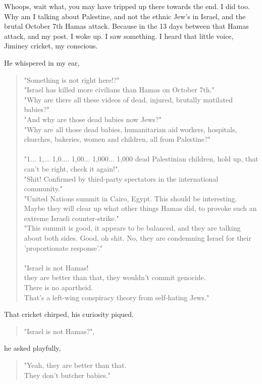 \documentclass[16pt,openany,oneside]{book}
\begin{document}
Whoops, wait what, you may have tripped up there towards the end. I did too. Why am I talking about Palestine, and not the ethnic Jew's in Israel, and the brutal October 7th Hamas attack. Because in the 13 days between that Hamas attack, and my post. I woke up. I saw something. I heard that little voice, Jiminey cricket, my conscious. 

He whispered in my ear,
\begin{quote}
    "Something is not right here!?" \\
    "Israel has killed more civilians than Hamas on October 7th." \\
    "Why are there all these videos of dead, injured, brutally mutilated babies?" \\
    "And why are those dead babies now Jews?" \\
    "Why are all those dead babies, humanitarian aid workers, hospitals, churches, bakeries, women and children, all from Palestine?"
    \\\\
    "1... 1,... 1,0.... 1,00... 1,000... 1,000 dead Palestinian children, hold up, that can't be right, check it again!". \\
    "Shit! Confirmed by third-party spectators in the international community." \\
    "United Nations summit in Cairo, Egypt. This should be interesting. Maybe they will clear up what other things Hamas did, to provoke such an extreme Israeli counter-strike." \\
    "This summit is good, it appears to be balanced, and they are talking about both sides. Good, oh shit. No, they are condemning Israel for their 'proportionate response'."
    \\\\
    "Israel is not Hamas! \\ 
    they are better than that, they wouldn't commit genocide. \\
    There is no apartheid. \\ 
    That's a left-wing conspiracy theory from self-hating Jews."
\end{quote}
That cricket chirped, his curiosity piqued.
\begin{quote}
    "Israel is not Hamas?",
\end{quote}
he asked playfully,
\begin{quote}    
    "Yeah, they are better than that.
    \\
    They don't butcher babies."
\end{quote}
\end{document}

